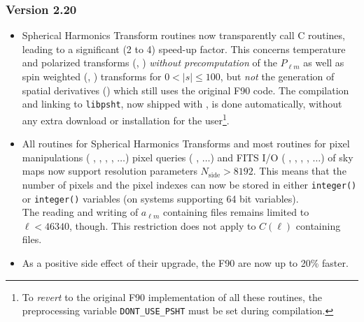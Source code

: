 \documentclass[12pt,twoside]{article}
\newcommand{\nside}{N_{\mathrm{side}}}
\newcommand{\compresslist}{%
\setlength{\itemsep}{0ex}}{}
\begin{document}
{\subsubsection*{Version 2.20}
\label{sub:new2p20}
\begin{itemize}\compresslist
\item Spherical Harmonics Transform routines now transparently call  C routines, leading to a significant (2 to 4) speed-up factor. This
concerns temperature and polarized transforms (, 
) {\em without precomputation} of the $P_{\ell m}$ as
well as spin 
weighted (, 
) transforms for $0 < |s| \le 100$,
but {\em not} the generation of spatial derivatives
() which still uses the original F90 code.
The compilation and linking to {\tt libpsht}, now shipped with \healpixns, is done
automatically, without any extra download or installation for the user\footnote{
To {\em revert} to the original F90 implementation of all these routines, the preprocessing
variable {\tt DONT\_USE\_PSHT} must be set during compilation.}.

\item All routines for Spherical Harmonics Transforms and most routines for
pixel manipulations (
,
, 
, 
,  
$\ldots$)
pixel queries (
,  $\ldots$) 
and FITS I/O (%
, 
, 
, 
,
$\ldots$)
of sky maps
now support resolution parameters $\nside > 8192$. 
This means that the number of
pixels and the pixel indexes can now be stored in either
{\tt integer()} or
{\tt integer()} variables (on systems
supporting 64 bit variables).\\
The reading and writing of
$a_{\ell m}$ containing files remains limited to $\ell < 46340 $, though. This
restriction does not apply to $C(\ell)$ containing files.

\item As a positive side effect of their upgrade, the F90
 are now up to 20\% faster.


\end{itemize}}
\end{document}

